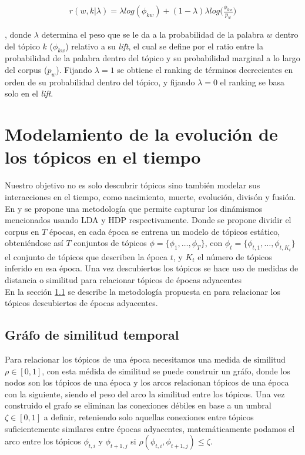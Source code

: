 \documentclass[letterpaper,12pt,oneside]{book} %
\begin{document}
\begin{align}
    r(w,k|\lambda) = \lambda log (\phi_{kw})+ (1-\lambda)\lambda log\bigg(\frac{\phi_{kw}}{p_{w}}\bigg)
\end{align}

, donde $\lambda$ determina el peso que se le da a la probabilidad de la palabra $w$ dentro del tópico $k$ ($\phi_{kw}$) relativo a su \textit{lift}, el cual se define por el ratio entre la probabilidad de la palabra dentro del tópico y su probabilidad marginal a lo largo del corpus ($p_w$). Fijando $\lambda=1$ se obtiene el ranking de términos decrecientes en orden de su probabilidad dentro del tópico, y fijando $\lambda=0$ el ranking se basa solo en el \textit{lift}.

\section{Modelamiento de la evolución de los tópicos en el tiempo}
\label{sec:topic_evolution}
Nuestro objetivo no es solo descubrir tópicos sino también modelar sus interacciones en el tiempo, como nacimiento, muerte, evolución, divisón y fusión.\\ 

En \citep{wilson2011tracking} y \citep{beykikhoshk2018discovering} se propone una metodología que permite capturar los dinámismos mencionados usando LDA y HDP respectivamente. Donde se propone dividir el corpus en $T$ épocas, en cada época se entrena un modelo de tópicos estático, obteniéndose así $T$ conjuntos de tópicos $\phi=\{\phi_{1}, \ldots, \phi_{T}\}$, con $\phi_{t}=\{\phi_{t,1}, \ldots, \phi_{t,K_{t}}\}$ el conjunto de tópicos que describen la época $t$, y $K_{t}$ el número de tópicos inferido en esa época. Una vez descubiertos los tópicos se hace uso de medidas de distancia o similitud para relacionar tópicos de épocas adyacentes \\

En la sección \ref{sec:similarity_graph} se describe la metodología propuesta en \citep{beykikhoshk2018discovering} para relacionar los tópicos descubiertos de épocas adyacentes.

\subsection{Gráfo de similitud temporal}
\label{sec:similarity_graph}
Para relacionar los tópicos de una época necesitamos una medida de similitud $\rho \in [0,1]$, con esta médida de similitud se puede construir un gráfo, donde los nodos son los tópicos de una época y los arcos relacionan tópicos de una época con la siguiente, siendo el peso del arco la similitud entre los tópicos. Una vez construido el grafo se eliminan las conexiones débiles en base a un umbral $\zeta \in [0,1]$ a definir, reteniendo solo aquellas conexiones entre tópicos suficientemente similares entre épocas adyacentes, matemáticamente podamos el arco entre los tópicos $\phi_{t,i}$ y $\phi_{t+1,j}$ si $\rho(\phi_{t,i}, \phi_{t+1,j})\leq \zeta$.\\
\end{document}
